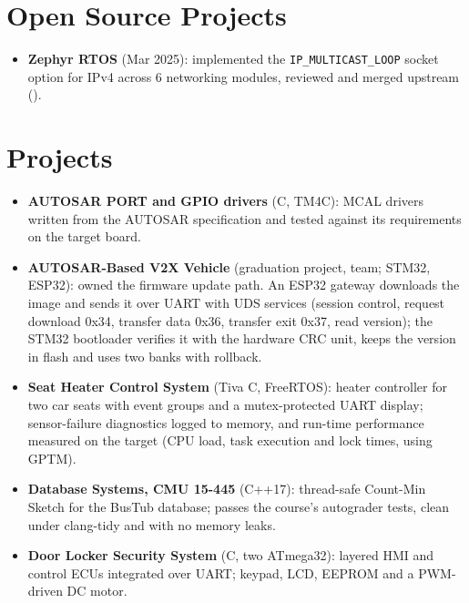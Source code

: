 \documentclass[10pt]{article}
\begin{document}
\section*{Open Source Projects}
\begin{itemize}
  \item \textbf{Zephyr RTOS} (Mar 2025): implemented the \texttt{IP\_MULTICAST\_LOOP} socket option for IPv4 across 6 networking modules, reviewed and merged upstream ().
\end{itemize}

\section*{Projects}
\begin{itemize}
  \item \textbf{AUTOSAR PORT and GPIO drivers} (C, TM4C): MCAL drivers written from the AUTOSAR specification and tested against its requirements on the target board.
  \item \textbf{AUTOSAR-Based V2X Vehicle} (graduation project, team; STM32, ESP32): owned the firmware update path. An ESP32 gateway downloads the image and sends it over UART with UDS services (session control, request download 0x34, transfer data 0x36, transfer exit 0x37, read version); the STM32 bootloader verifies it with the hardware CRC unit, keeps the version in flash and uses two banks with rollback. 
  \item \textbf{Seat Heater Control System} (Tiva C, FreeRTOS): heater controller for two car seats with event groups and a mutex-protected UART display; sensor-failure diagnostics logged to memory, and run-time performance measured on the target (CPU load, task execution and lock times, using GPTM). 
  \item \textbf{Database Systems, CMU 15-445} (C++17): thread-safe Count-Min Sketch for the BusTub database; passes the course's autograder tests, clean under clang-tidy and with no memory leaks. 
  \item \textbf{Door Locker Security System} (C, two ATmega32): layered HMI and control ECUs integrated over UART; keypad, LCD, EEPROM and a PWM-driven DC motor. 
\end{itemize}
\end{document}
